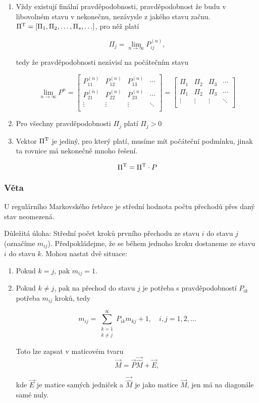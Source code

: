 \begin{enumerate}
\item Vždy existují finální pravděpodobnosti, pravděpodobnost že budu v libovolném stavu v nekonečnu, nezávysle z jakého stavu začnu. $\Pi^{\mathrm{T}}=[\Pi_1,\Pi_2,\ldots,\Pi_s,\ldots]$, pro něž platí

\[ \Pi_j=\lim_{n\to\infty}P_{ij}^{(n)}, \]

tedy že pravděpodobnosti nezávisí na počátečním stavu

\[ \lim_{n\to\infty}P^n =
\begin{bmatrix}
P_{11}^{(n)} & P_{12}^{(n)} & P_{13}^{(n)}  & \cdots \\
P_{21}^{(n)} & P_{22}^{(n)} & P_{23}^{(n)}  & \cdots \\
\vdots & \vdots & \vdots & \ddots \\
\end{bmatrix}
=
\begin{bmatrix}
\Pi_1 & \Pi_2 & \Pi_3 & \cdots \\
\Pi_1 & \Pi_2 & \Pi_3 & \cdots \\
\vdots & \vdots & \vdots & \ddots \\
\end{bmatrix}
\]

\item Pro všechny pravděpodobnosti $\Pi_j$ platí $\Pi_j>0$

\item Vektor $\Pi^{\mathrm{T}}$ je jediný, pro který platí, musíme mít počáteční podmínku, jinak ta rovnice má nekonečně mnoho řešení.

\[ \Pi^{\mathrm{T}}=\Pi^{\mathrm{T}}\cdot P \]
\end{enumerate}

\subsubsection{Věta}
U regulárního Markovského řetězce je střední hodnota počtu přechodů přes daný stav neomezená.\br

Důležitá úloha: Střední počet kroků prvního přechodu ze stavu $i$ do stavu $j$ (označíme $m_{ij}$). Předpokládejme, že se během jednoho kroku dostaneme ze stavu $i$ do stavu $k$. Mohou nastat dvě situace:

\begin{enumerate}
\item Pokud $k=j$, pak $m_{ij}=1$.
\item Pokud $k\neq j$, pak na přechod do stavu $j$ je potřeba s pravděpodobností $P_{ik}$ potřeba $m_{ij}$ kroků, tedy

\[ m_{ij}=\sum_{\substack{k=1\\k\neq j}}^\infty P_{ik}m_{kj}+1,\quad i,j=1,2,\ldots \]

Toto lze zapsat v maticovém tvaru
\[ \vec{M} = \vec{P}\vec{\widehat{M}} + \vec{E}, \]

kde $\vec{E}$ je matice samých jedniček a $\vec{\widehat{M}}$ je jako matice $\vec{M}$, jen má na diagonále samé nuly.
\end{enumerate}

